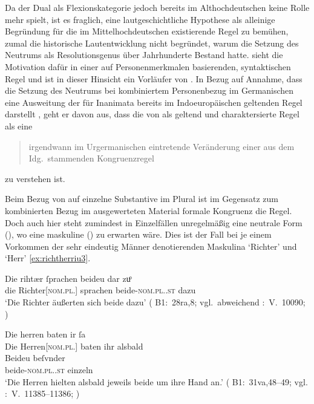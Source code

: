 Da der Dual als Flexionskategorie jedoch bereits im Althochdeutschen keine
Rolle mehr spielt, ist es fraglich, eine lautgeschichtliche Hypothese als
alleinige Begründung für die im Mittel\-hoch\-deutschen existierende Regel zu
bemühen, zumal die historische Lautentwicklung nicht begründet, warum die
Setzung des Neutrums als Resolutionsgenus über Jahrhunderte Bestand hatte.
\citet{askedal1973} sieht die Motivation dafür in einer auf Personenmerkmalen
basierenden, syntaktischen Regel und ist in dieser Hinsicht ein Vorläufer von
\citet{corbett1983,wechslerzlatic2003}. In Bezug auf
 Annahme, dass die Setzung des Neutrums bei
kombiniertem Personenbezug im Germanischen eine Ausweitung der für Inanimata
bereits im Indoeuropäischen geltenden Regel darstellt
\autocite[vgl.~auch][156--157]{hock2008}, geht er davon aus, dass die von
\textcites[28]{behaghel1928}[188]{dal2014} als 
geltend und  charaktersierte Regel als eine
\blockcquote[15]{askedal1973}{irgendwann im Urgermanischen
eintretende\textdel{} Veränderung einer aus dem Idg.\ stammenden
Kongruenzregel} zu verstehen ist.

Beim Bezug von  auf einzelne Substantive im Plural ist im
Gegensatz zum kombinierten Bezug im ausgewerteten Material formale Kongruenz
die Regel. Doch auch hier steht zumindest in Einzelfällen unregelmäßig eine
neutrale Form (), wo eine maskuline () zu erwarten
wäre. Dies ist der Fall bei je einem Vorkommen der sehr eindeutig Männer
denotierenden Maskulina  `Richter' und 
`Herr' \cref{ex:richtherriu3}.

\begin{exe}
\ex \label{ex:richtherriu3}
	\begin{xlist}
	\ex \gll Die rihtær ſprachen beideu {dar zuͦ} \\
			die Richter[\textsc{nom.pl.\MascM}] sprachen
				beide-\textsc{nom.pl.\NeutM.st} dazu \\
		\trans `Die Richter äußerten sich beide dazu'
			(%
				B1:~28ra,8; vgl.~abweichend
				\KC:~V.~10090;
				\citet[267]{schroeder1895}%
			)
		\label{ex:richtherriu3_1}

	\ex \gll Die herren baten ir ſa \\
			Die Herren[\textsc{nom.pl.\MascM}] baten ihr alsbald \\
	\sn \gll Beideu beſvnder \\
			beide-\textsc{nom.pl.\NeutM.st} einzeln \\
		\trans `Die Herren hielten alsbald jeweils beide um ihre Hand an.'
			(%
				B1:~31va,48--49; vgl.
				\KC:~V.~11385--11386;
				\cite[289]{schroeder1895}%
			)
		\label{ex:richtherriu3_2}
	\end{xlist}
\end{exe}

